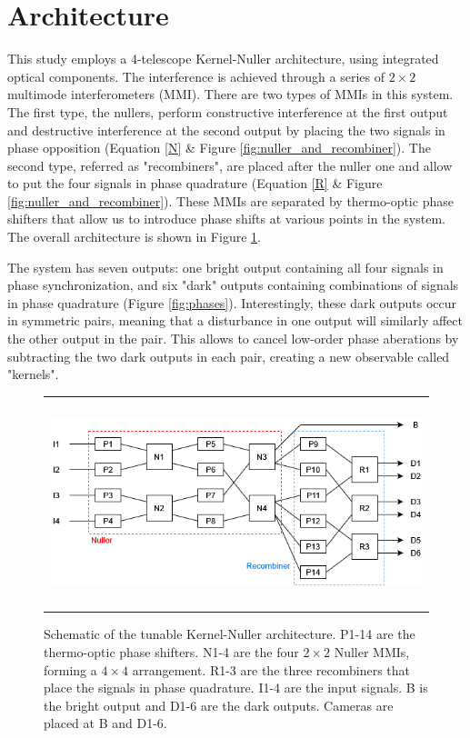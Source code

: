 \documentclass[]{spie}  %
\begin{document}
\section{Architecture}

This study employs a 4-telescope Kernel-Nuller architecture, using integrated optical components. The interference is achieved through a series of $2 \times 2$ multimode interferometers\cite{MMI} (MMI). There are two types of MMIs in this system. The first type, the nullers, perform constructive interference at the first output and destructive interference at the second output by placing the two signals in phase opposition (Equation \ref{N} \& Figure \ref{fig:nuller_and_recombiner}). The second type, referred as "recombiners", are placed after the nuller one and allow to put the four signals in phase quadrature (Equation \ref{R} \& Figure \ref{fig:nuller_and_recombiner}). These MMIs are separated by thermo-optic phase shifters that allow us to introduce phase shifts at various points in the system. The overall architecture is shown in Figure \ref{fig:kernel_nuller}.

The system has seven outputs: one bright output containing all four signals in phase synchronization, and six "dark" outputs containing combinations of signals in phase quadrature (Figure \ref{fig:phases}). Interestingly, these dark outputs occur in symmetric pairs, meaning that a disturbance in one output will similarly affect the other output in the pair. This allows to cancel low-order phase aberations by subtracting the two dark outputs in each pair, creating a new observable called "kernels"\cite{Martinache et al. 2018}.

\begin{figure} [H]
    \begin{center}
    \begin{tabular}{c}
    \includegraphics[height=6cm]{img/kernel_nuller.png}
    \end{tabular}
    \end{center}
    \caption[kernel_nuller] 
    { \label{fig:kernel_nuller} 
    Schematic of the tunable Kernel-Nuller architecture. P1-14 are the thermo-optic phase shifters. N1-4 are the four $2 \times 2$ Nuller MMIs, forming a $4 \times 4$ arrangement. R1-3 are the three recombiners that place the signals in phase quadrature. I1-4 are the input signals. B is the bright output and D1-6 are the dark outputs. Cameras are placed at B and D1-6.}
\end{figure} 
\end{document}
